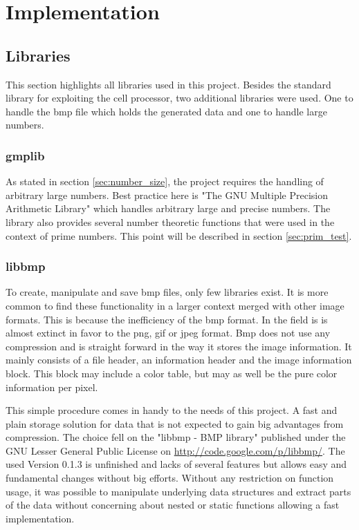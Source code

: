 \section{Implementation}
\label{sec:implementation}
\subsection{Libraries}
This section highlights all libraries used in this project. Besides the standard library for exploiting the cell processor, two additional libraries were used. One to handle the bmp file which holds the generated data and one to handle large numbers.

\subsubsection{gmplib}
As stated in section \ref{sec:number_size}, the project requires the handling of arbitrary large numbers. Best practice here is "The GNU Multiple Precision Arithmetic Library" which handles arbitrary large and precise numbers. The library also provides several number theoretic functions that were used in the context of prime numbers. This point will be described in section \ref{sec:prim_test}.

\subsubsection{libbmp}
To create, manipulate and save bmp files, only few libraries exist. It is more common to find these functionality in a larger context merged with other image formats. This is because the inefficiency of the bmp format. In the field is is almost extinct in favor to the png, gif or jpeg format. Bmp does not use any compression and is straight forward in the way it stores the image information. It mainly consists of a file header, an information header and the image information block. This block may include a color table, but may as well be the pure color information per pixel.

This simple procedure comes in handy to the needs of this project. A fast and plain storage solution for data that is not expected to gain big advantages from compression. The choice fell on the "libbmp - BMP library" published under the GNU Lesser General Public License on \url{http://code.google.com/p/libbmp/}. The used Version 0.1.3 is unfinished and lacks of several features but allows easy and fundamental changes without big efforts. Without any restriction on function usage, it was possible to manipulate underlying data structures and extract parts of the data without concerning about nested or static functions allowing a fast implementation.

